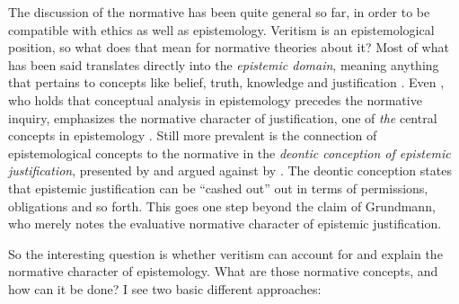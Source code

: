 \documentclass[12pt,numbers=noenddot]{scrartcl}
\begin{document}
The discussion of the normative has been quite general so far, in order to be compatible with ethics as well as epistemology. Veritism is an epistemological position, so what does that mean for normative theories about it? Most of what has been said translates directly into the \emph{epistemic domain}, meaning anything that pertains to concepts like belief, truth, knowledge and justification \autocite{David2001-DAVTAT-7}. Even \textcite[7]{grundmann2008}, who holds that conceptual analysis in epistemology precedes the normative inquiry, emphasizes the normative character of justification, one of \emph{the} central concepts in epistemology \autocite[226]{grundmann2008}. Still more prevalent is the connection of epistemological concepts to the normative in the \emph{deontic conception of epistemic justification}, presented by \textcite{Steup1988-STETDC} and argued against by \textcite{Alston1988-ALSTDC}. The deontic conception states that epistemic justification can be “cashed out” out in terms of permissions, obligations and so forth. This goes one step beyond the claim of Grundmann, who merely notes the evaluative normative character of epistemic justification.

So the interesting question is whether veritism can account for and explain the normative character of epistemology. What are those normative concepts, and how can it be done? I see two basic different approaches:
\end{document}
